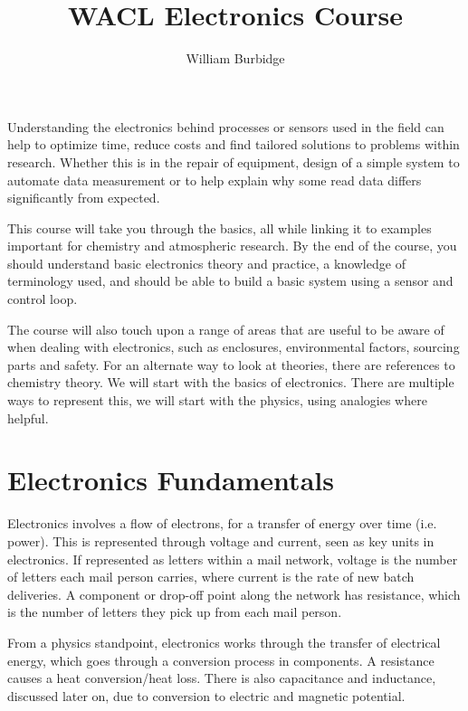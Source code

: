 \documentclass[a4paper,11pt]{report}
\title{WACL Electronics Course}
\author{William Burbidge}
\begin{document}
\maketitle

\tableofcontents

\doublespacing

\pagebreak

Understanding the electronics behind processes or sensors used in the field can help to optimize time, reduce costs and find tailored solutions to problems within research. Whether this is in the repair of equipment, design of a simple system to automate data measurement or to help explain why some read data differs significantly from expected.

This course will take you through the basics, all while linking it to examples important for chemistry and atmospheric research. By the end of the course, you should understand basic electronics theory and practice, a knowledge of terminology used, and should be able to build a basic system using a sensor and control loop.

The course will also touch upon a range of areas that are useful to be aware of when dealing with electronics, such as enclosures, environmental factors, sourcing parts and safety. For an alternate way to look at theories, there are references to chemistry theory. We will start with the basics of electronics. There are multiple ways to represent this, we will start with the physics, using analogies where helpful.

\section{Electronics Fundamentals}

Electronics involves a flow of electrons, for a transfer of energy over time (i.e. power). This is represented through voltage and current, seen as key units in electronics. If represented as letters within a mail network, voltage is the number of letters each mail person carries, where current is the rate of new batch deliveries. A component or drop-off point along the network has resistance, which is the number of letters they pick up from each mail person.

From a physics standpoint, electronics works through the transfer of electrical energy, which goes through a conversion process in components. A resistance causes a heat conversion/heat loss. There is also capacitance and inductance, discussed later on, due to conversion to electric and magnetic potential.
\end{document}
